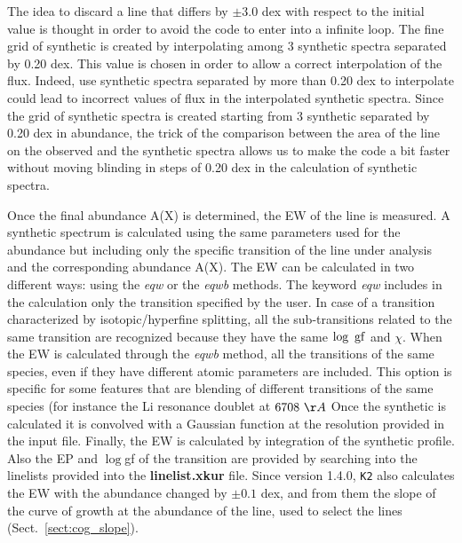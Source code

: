 \documentclass[modern]{aastex701}
\begin{document}
The idea to discard a line that differs by $\pm3.0$ dex with respect to the initial value is thought in order to avoid the code to enter into a infinite loop. The fine grid of synthetic is created by interpolating among 3 synthetic spectra separated by 0.20 dex. This value is chosen in order to allow a correct interpolation of the flux. Indeed, use synthetic spectra separated by more than 0.20 dex to interpolate could lead to incorrect  values of flux in the interpolated synthetic spectra.  Since the grid of synthetic spectra is created starting from 3 synthetic separated by 0.20 dex in abundance, the trick of the comparison between the area of the line on the observed and the synthetic spectra allows us to make the code a bit faster without moving blinding in steps of 0.20 dex in the calculation of synthetic spectra. 

Once the final abundance A(X) is determined, the EW of the line is measured. 
A synthetic spectrum is calculated using the same parameters used for the abundance but including only the specific transition of the line under analysis and the corresponding abundance A(X).  The EW can be calculated in two different ways: using the {\it eqw} or the {\it eqwb} methods. 
The keyword {\it eqw} includes in the calculation only the transition specified by the user. In case of a transition characterized by isotopic/hyperfine splitting, all the sub-transitions related to the same transition are recognized because they have the same $\rm \log~gf$ and $\chi$. 
When the EW is calculated through the {\it eqwb} method, all the transitions of the same species, even if they have different atomic parameters are included. This option is specific for some features that are blending of different transitions of the same species (for instance the
Li resonance doublet at $6708~\AA$
Once the synthetic is calculated it is convolved with a Gaussian function at the resolution provided in the input file. Finally, the EW is calculated by integration of the synthetic profile. Also the EP and $\log$gf of the transition are provided by searching into the linelists provided into the {\bf linelist.xkur} file. Since version 1.4.0, \texttt{K2} also calculates the EW with the abundance changed by $\pm 0.1$ dex, and from them the slope of the curve of growth at the abundance of the line, used to select the lines (Sect.~\ref{sect:cog_slope}).
\end{document}
